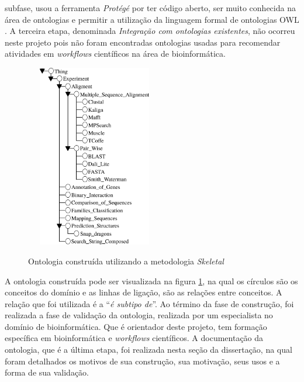 \usepackage{pdfpages}     		%
\usepackage{algorithm}			%
\usepackage{mdwlist}			%
\usepackage[noend]{algpseudocode}			%
\usepackage{lipsum}				%
\usepackage{subcaption}
\usepackage{amsmath}
\usepackage{epstopdf}
\usepackage{array}
\usepackage{graphicx}
\usepackage{multirow}
\usepackage{amstext}
\usepackage{longtable, tabu}
\usepackage[dvipsnames]{xcolor}
\usepackage{amsfonts}
\usepackage{bm}
 subfase, usou a ferramenta \emph{Protégé} \cite{Protege2014} por ter código aberto, ser muito conhecida na área de ontologias e permitir a utilização da linguagem formal de ontologias OWL \cite{W3COWL2015}. A terceira etapa, denominada \emph{Integração com ontologias existentes}, não ocorreu neste projeto pois não foram encontradas ontologias usadas para recomendar atividades em \emph{workflows} científicos na área de bioinformática.
\begin{figure}[hbt]
	\centering
 	\caption{Ontologia construída utilizando a metodologia \emph{Skeletal}}
		\includegraphics[width=6cm, height=8cm]{./secoes/solucaoProposta/pics/img/Ontologia.eps}
	\label{FIGURA_ONTOLOGIA_CONSTRUIDA}
	\vspace{0.1cm}
	\source{\varAutorData}
\end{figure}

A ontologia construída pode ser visualizada na figura \ref{FIGURA_ONTOLOGIA_CONSTRUIDA}, na qual os círculos são os conceitos do domínio e as linhas de ligação, são as relações entre conceitos. A relação que foi utilizada é a ``\emph{é subtipo de}''. Ao término da fase de construção, foi realizada a fase de validação da ontologia, realizada por um especialista no domínio de bioinformática. Que é orientador deste projeto, tem formação específica em bioinformática e \emph{workflows} científicos. A documentação da ontologia, que é a última etapa, foi realizada nesta seção da dissertação, na qual foram detalhados os motivos de sua construção, sua motivação, seus usos e a forma de sua validação.

